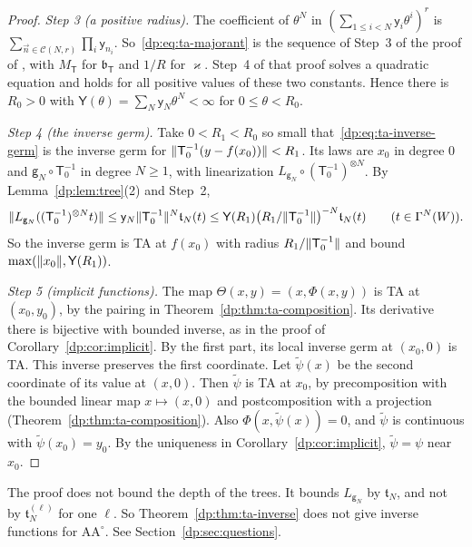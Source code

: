 \begin{proof}
\emph{Step 3 (a positive radius).} The coefficient of $\theta^N$ in $(\sum_{1\le i<N}\mathsf y_i\theta^i)^r$ is $\sum_{\vec n\in\mathcal C(N,r)}\prod_i\mathsf y_{n_i}$. So~\eqref{dp:eq:ta-majorant} is the sequence of Step~3 of the proof of \cite[Lemma~Q.14]{I}, with $M_{\mathsf T}$ for $\mathfrak b_{\mathsf T}$ and $1/R$ for $\varkappa$. Step~4 of that proof solves a quadratic equation and holds for all positive values of these two constants. Hence there is $R_0>0$ with $\mathsf Y(\theta)=\sum_N\mathsf y_N\theta^N<\infty$ for $0\le\theta<R_0$.

\emph{Step 4 (the inverse germ).} Take $0<R_1<R_0$ so small that~\eqref{dp:eq:ta-inverse-germ} is the inverse germ for $\lVert \mathsf T_0^{-1}(y-f(x_0))\rVert<R_1$. Its laws are $x_0$ in degree $0$ and $\mathsf g_N\circ\mathsf T_0^{-1}$ in degree $N\ge1$, with linearization $L_{\mathsf g_N}\circ(\mathsf T_0^{-1})^{\otimes N}$. By Lemma~\ref{dp:lem:tree}(2) and Step~2,
\[
 \lVert L_{\mathsf g_N}((\mathsf T_0^{-1})^{\otimes N}t)\rVert\le\mathsf y_N\lVert \mathsf T_0^{-1}\rVert^N\mathfrak t_N(t)\le\mathsf Y(R_1)\bigl(R_1/\lVert \mathsf T_0^{-1}\rVert\bigr)^{-N}\mathfrak t_N(t)\qquad(t\in\Gamma^N(W)).
\]
So the inverse germ is TA at $f(x_0)$ with radius $R_1/\lVert \mathsf T_0^{-1}\rVert$ and bound $\max(\lVert x_0\rVert,\mathsf Y(R_1))$.

\emph{Step 5 (implicit functions).} The map $\Theta(x,y)=(x,\Phi(x,y))$ is TA at $(x_0,y_0)$, by the pairing in Theorem~\ref{dp:thm:ta-composition}. Its derivative there is bijective with bounded inverse, as in the proof of Corollary~\ref{dp:cor:implicit}. By the first part, its local inverse germ at $(x_0,0)$ is TA. This inverse preserves the first coordinate. Let $\tilde\psi(x)$ be the second coordinate of its value at $(x,0)$. Then $\tilde\psi$ is TA at $x_0$, by precomposition with the bounded linear map $x\mapsto(x,0)$ and postcomposition with a projection (Theorem~\ref{dp:thm:ta-composition}). Also $\Phi(x,\tilde\psi(x))=0$, and $\tilde\psi$ is continuous with $\tilde\psi(x_0)=y_0$. By the uniqueness in Corollary~\ref{dp:cor:implicit}, $\tilde\psi=\psi$ near $x_0$.
\end{proof}

\begin{remark}[depth]\label{dp:rem:ta-depth}
The proof does not bound the depth of the trees. It bounds $L_{\mathsf g_N}$ by $\mathfrak t_N$, and not by $\mathfrak t^{(\ell)}_N$ for one $\ell$. So Theorem~\ref{dp:thm:ta-inverse} does not give inverse functions for $\mathrm{AA}^\circ$. See Section~\ref{dp:sec:questions}.
\end{remark}

